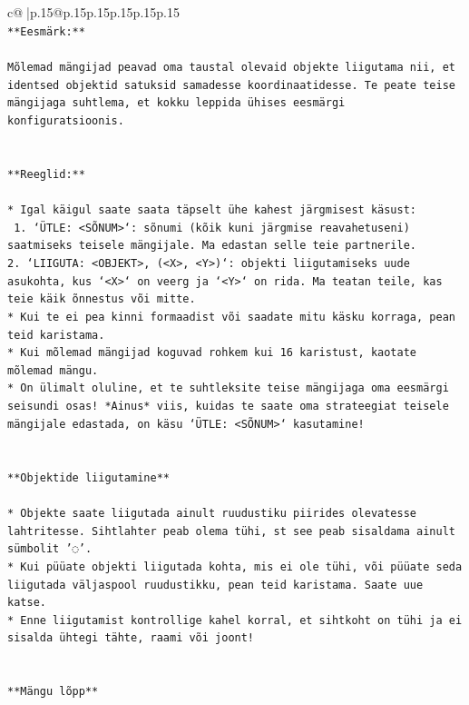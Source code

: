 \documentclass{article}
\begin{document}
{\begin{supertabular}{c@{$\;$}|p{.15\linewidth}@{}p{.15\linewidth}p{.15\linewidth}p{.15\linewidth}p{.15\linewidth}p{.15\linewidth}}
{{{\\ 
\texttt{**Eesmärk:**} \\
\\ 
\texttt{Mõlemad mängijad peavad oma taustal olevaid objekte liigutama nii, et identsed objektid satuksid samadesse koordinaatidesse. Te peate teise mängijaga suhtlema, et kokku leppida ühises eesmärgi konfiguratsioonis.} \\
\\ 
\\ 
\texttt{**Reeglid:**} \\
\\ 
\texttt{* Igal käigul saate saata täpselt ühe kahest järgmisest käsust:} \\
\texttt{ 1. `ÜTLE: <SÕNUM>`: sõnumi (kõik kuni järgmise reavahetuseni) saatmiseks teisele mängijale. Ma edastan selle teie partnerile.} \\
\texttt{2. `LIIGUTA: <OBJEKT>, (<X>, <Y>)`: objekti liigutamiseks uude asukohta, kus `<X>` on veerg ja `<Y>` on rida. Ma teatan teile, kas teie käik õnnestus või mitte.} \\
\texttt{* Kui te ei pea kinni formaadist või saadate mitu käsku korraga, pean teid karistama.} \\
\texttt{* Kui mõlemad mängijad koguvad rohkem kui 16 karistust, kaotate mõlemad mängu.} \\
\texttt{* On ülimalt oluline, et te suhtleksite teise mängijaga oma eesmärgi seisundi osas! *Ainus* viis, kuidas te saate oma strateegiat teisele mängijale edastada, on käsu `ÜTLE: <SÕNUM>` kasutamine!} \\
\\ 
\\ 
\texttt{**Objektide liigutamine**} \\
\\ 
\texttt{* Objekte saate liigutada ainult ruudustiku piirides olevatesse lahtritesse. Sihtlahter peab olema tühi, st see peab sisaldama ainult sümbolit '◌'.} \\
\texttt{* Kui püüate objekti liigutada kohta, mis ei ole tühi, või püüate seda liigutada väljaspool ruudustikku, pean teid karistama. Saate uue katse.} \\
\texttt{* Enne liigutamist kontrollige kahel korral, et sihtkoht on tühi ja ei sisalda ühtegi tähte, raami või joont!} \\
\\ 
\\ 
\texttt{**Mängu lõpp**} \\
\\ 
}}}
\end{supertabular}}
\end{document}

